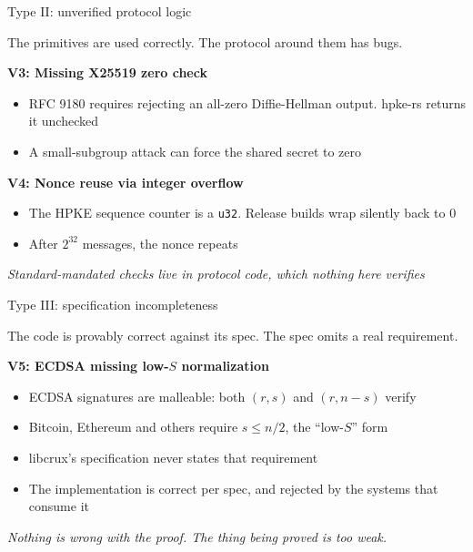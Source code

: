 \ifdefined\PRESENTATION\else\PassOptionsToClass{handout}{beamer}\fi\documentclass[aspectratio=169, lualatex]{beamer}
\begin{document}
\begin{frame}{Type II: unverified protocol logic}
	\begin{center}
		\Large
		The primitives are used correctly. The protocol around them has bugs.
	\end{center}
	\vspace{0.7em}
	\textbf{V3: Missing X25519 zero check}
	\begin{itemize}
		\item RFC 9180 requires rejecting an all-zero Diffie-Hellman output. hpke-rs returns it unchecked
		\item A small-subgroup attack can force the shared secret to zero
	\end{itemize}
	\vspace{0.3em}
	\textbf{V4: Nonce reuse via integer overflow}
	\begin{itemize}
		\item The HPKE sequence counter is a \texttt{u32}. Release builds wrap silently back to 0
		\item After $2^{32}$ messages, the nonce repeats
	\end{itemize}
	\vspace{0.5em}
	\begin{center}
		\textit{Standard-mandated checks live in protocol code, which nothing here verifies}
	\end{center}
\end{frame}

\begin{frame}{Type III: specification incompleteness}
	\begin{center}
		\Large
		The code is provably correct against its spec. The spec omits a real requirement.
	\end{center}
	\vspace{1em}
	\textbf{V5: ECDSA missing low-$S$ normalization}
	\begin{itemize}
		\item ECDSA signatures are malleable: both $(r, s)$ and $(r, n-s)$ verify
		\item Bitcoin, Ethereum and others require $s \leq n/2$, the ``low-$S$'' form
		\item libcrux's \fstar specification never states that requirement
		\item The implementation is correct per spec, and rejected by the systems that consume it
	\end{itemize}
	\vspace{0.5em}
	\begin{center}
		\textit{Nothing is wrong with the proof. The thing being proved is too weak.}
	\end{center}
\end{frame}
\end{document}

